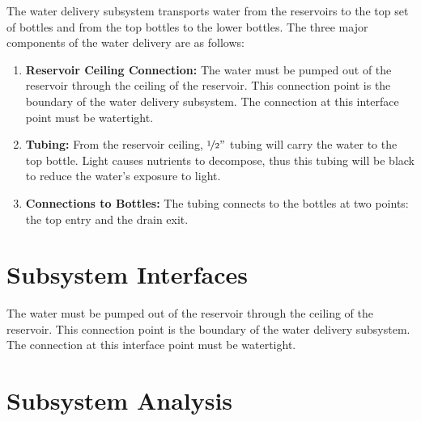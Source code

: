 \documentclass[12pt]{article}
\begin{document}

The water delivery subsystem transports water from the reservoirs to the top set of bottles and from
the top bottles to the lower bottles. The three major components of the water delivery are as
follows:

\begin{enumerate}
    \item \textbf{Reservoir Ceiling Connection:} The water must be pumped out of the reservoir
        through the ceiling of the reservoir. This connection point is the boundary of the water
        delivery subsystem. The connection at this interface point must be watertight.

    \item \textbf{Tubing:} From the reservoir ceiling, $\nicefrac{1}{2}"$ tubing will carry the
        water to the top bottle. Light causes nutrients to decompose, thus this tubing will be black
        to reduce the water's exposure to light.

    \item \textbf{Connections to Bottles:} The tubing connects to the bottles at two points: the top
        entry and the drain exit.

\end{enumerate}

\section{Subsystem Interfaces}


The water must be pumped out of the reservoir through the ceiling of the reservoir. This connection
point is the boundary of the water delivery subsystem. The connection at this interface point must
be watertight.





\section{Subsystem Analysis}
\end{document}
